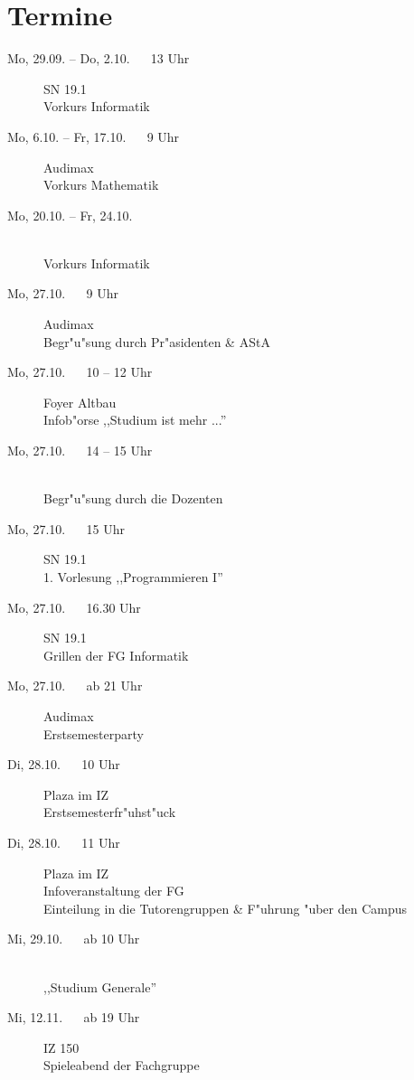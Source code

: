 \section{Termine}

\begin{description}
  \item[Mo, 29.09. -- Do, 2.10. ~~ 13 Uhr] \hfill SN 19.1 \\
  Vorkurs Informatik
  \item[Mo, 6.10. -- Fr, 17.10. ~~ 9 Uhr] \hfill Audimax \\
  Vorkurs Mathematik
  \item[Mo, 20.10. -- Fr, 24.10.] \ \\
  Vorkurs Informatik\footnotemark[1]
  \item[Mo, 27.10. ~~ 9 Uhr] \hfill Audimax \\
  Begr"u"sung durch Pr"asidenten \& AStA
  \item[Mo, 27.10. ~~ 10 -- 12 Uhr] \hfill Foyer Altbau \\
  Infob"orse ,,Studium ist mehr ...''
  \item[Mo, 27.10. ~~ 14 -- 15 Uhr] \ \\
  Begr"u"sung durch die Dozenten
  \item[Mo, 27.10. ~~ 15 Uhr] SN 19.1 \\
  1. Vorlesung ,,Programmieren I''
  \item[Mo, 27.10. ~~ 16.30 Uhr] SN 19.1 \\
  Grillen der FG Informatik
  \item[Mo, 27.10. ~~ ab 21 Uhr] \hfill Audimax \\
  Erstsemesterparty
  \item[Di, 28.10. ~~ 10 Uhr] \hfill Plaza im IZ \\
  Erstsemesterfr"uhst"uck
  \item[Di, 28.10. ~~ 11 Uhr] \hfill Plaza im IZ \\
  Infoveranstaltung der FG \\
  Einteilung in die Tutorengruppen \& F"uhrung "uber den Campus
  \item[Mi, 29.10. ~~ ab 10 Uhr] \ \\
  ,,Studium Generale''
  \item[Mi, 12.11. ~~ ab 19 Uhr] \hfill IZ 150 \\
  Spieleabend der Fachgruppe
\end{description}


